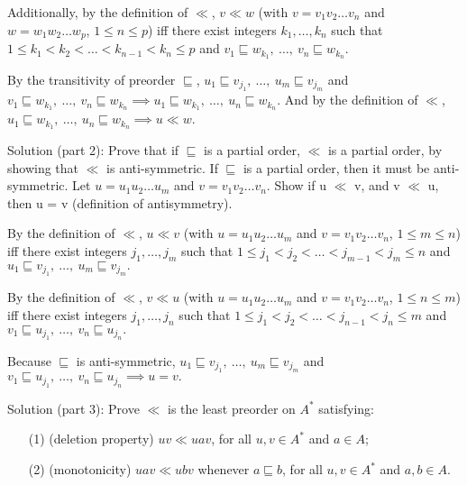 \documentclass[12pt]{article}
\begin{document}
\medskip
Additionally, by the definition of $\ll$, $v \ll w$ (with $v=v_{1}v_{2}\ldots v_{n}$ and
$w=w_{1}w_{2}\ldots w_{p}$, $1\leq n\leq p$) iff there exist integers $k_{1},\ldots,k_{n}$ such that
$1\leq k_{1} < k_{2} < \ldots < k_{n-1} < k_{n} \leq p$ and
$v_{1} \sqsubseteq w_{k_{1}},\ \ldots,\ v_{n} \sqsubseteq w_{k_{n}}.$

\medskip
By the transitivity of preorder $\sqsubseteq $, $u_{1} \sqsubseteq v_{j_{1}},\ \ldots,\ u_{m} \sqsubseteq v_{j_{m}}$
and $v_{1} \sqsubseteq w_{k_{1}},\ \ldots,\ v_{n} \sqsubseteq w_{k_{n}} \implies u_{1} \sqsubseteq w_{k_{1}},\ \ldots,\ u_{n} \sqsubseteq w_{k_{n}}$.
And by the definition of $\ll$, $u_{1} \sqsubseteq w_{k_{1}},\ \ldots,\ u_{n} \sqsubseteq w_{k_{n}} \implies u \ll w$.

\medskip
\medskip

Solution (part 2): Prove that if $\sqsubseteq $ is a partial order, $\ll$ is a partial order, by showing that $\ll$ is anti-symmetric. If $\sqsubseteq $ is a
partial order, then it must be anti-symmetric. Let $u=u_{1}u_{2}\ldots u_{m}$ and
$v=v_{1}v_{2}\ldots v_{n}$. Show if u $\ll$ v, and v $\ll$ u, then u = v (definition of antisymmetry).
\medskip

By the definition of $\ll$, $u \ll v$ (with $u=u_{1}u_{2}\ldots u_{m}$ and
$v=v_{1}v_{2}\ldots v_{n}$, $1\leq m\leq n$) iff there exist integers $j_{1},\ldots,j_{m}$ such that
$1\leq j_{1} < j_{2} < \ldots < j_{m-1} < j_{m} \leq n$ and
$u_{1} \sqsubseteq v_{j_{1}},\ \ldots,\ u_{m} \sqsubseteq v_{j_{m}}.$

By the definition of $\ll$, $v \ll u$ (with $u=u_{1}u_{2}\ldots u_{m}$ and
$v=v_{1}v_{2}\ldots v_{n}$, $1\leq n\leq m$) iff there exist integers $j_{1},\ldots,j_{n}$ such that
$1\leq j_{1} < j_{2} < \ldots < j_{n-1} < j_{n} \leq m$ and
$v_{1} \sqsubseteq u_{j_{1}},\ \ldots,\ v_{n} \sqsubseteq u_{j_{n}}.$

\medskip

Because $\sqsubseteq $ is anti-symmetric, $u_{1} \sqsubseteq v_{j_{1}},\ \ldots,\ u_{m} \sqsubseteq v_{j_{m}}$ and
$v_{1} \sqsubseteq u_{j_{1}},\ \ldots,\ v_{n} \sqsubseteq u_{j_{n}} \implies u = v.$


\medskip
\medskip

Solution (part 3): Prove $\ll$ is the least preorder on $A^\ast$ satisfying:
\begin{enumerate}
\item[(1)] (deletion property)
$uv \ll uav$, for all $u, v\in A^{*}$ and $a\in A$;
\medskip
\item[(2)] (monotonicity)
$uav \ll ubv$ whenever $a \sqsubseteq b$, for all $u, v\in A^{*}$ and $a, b\in A$.
\end{enumerate}
\end{document}
